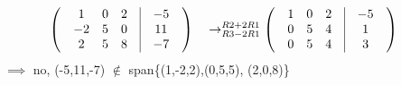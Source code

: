 \documentclass{article}
\theoremstyle{definition}
\theoremstyle{thrm}
\begin{document}
\begin{equation*}
	\begin{pmatrix}
		&1 & 0 & 2 &\vline&-5&\\
		&-2 & 5 & 0&\vline&11&\\
		&2 & 5 & 8 &\vline&-7&\\
	\end{pmatrix}\quad \rightarrow_{R3-2R1}^{R2+2R1}
	\begin{pmatrix}
		&1 & 0 & 2 &\vline&-5&\\
		&0 & 5 & 4 &\vline&1&\\
		&0 & 5 & 4 &\vline&3&\\
	\end{pmatrix}\\ \quad 
\end{equation*}
$\implies$ no, (-5,11,-7) $\notin$ span\{(1,-2,2),(0,5,5), (2,0,8)\}
\end{document}
